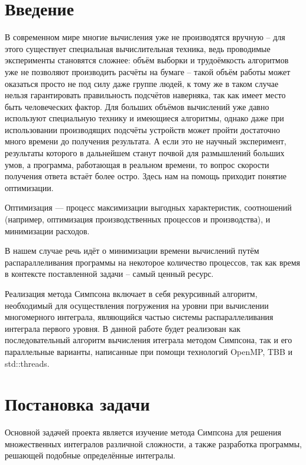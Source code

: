 \documentclass{report}
\begin{document}
\setcounter{page}{2}

\tableofcontents
\newpage

\section*{Введение}
В современном мире многие вычисления уже не производятся вручную – для этого существует специальная вычислительная техника, ведь проводимые эксперименты становятся сложнее: объём выборки и трудоёмкость алгоритмов уже не позволяют производить расчёты на бумаге – такой объём работы может оказаться просто не под силу даже группе людей, к тому же в таком случае нельзя гарантировать правильность подсчётов наверняка, так как имеет место быть человеческих фактор. Для больших объёмов вычислений уже давно используют специальную технику и имеющиеся алгоритмы, однако даже при использовании производящих подсчёты устройств может пройти достаточно много времени до получения результата. А если это не научный эксперимент, результаты которого в дальнейшем станут почвой для размышлений больших умов, а программа, работающая в реальном времени, то вопрос скорости получения ответа встаёт более остро. Здесь нам на помощь приходит понятие оптимизации.
\par Оптимизация — процесс максимизации выгодных характеристик, соотношений (например, оптимизация производственных процессов и производства), и минимизации расходов.
\par В нашем случае речь идёт о минимизации времени вычислений путём распараллеливания программы на некоторое количество процессов, так как время в контексте поставленной задачи – самый ценный ресурс.
\par Реализация метода Симпсона включает в себя рекурсивный алгоритм, необходимый для осуществления погружения на уровни при вычислении многомерного интеграла, являющийся частью системы распараллеливания интеграла первого уровня. В данной работе будет реализован как последовательный алгоритм вычисления итеграла методом Симпсона, так и его параллельные варианты, написанные при помощи технологий OpenMP, TBB и std::threads. 
\newpage

\section*{Постановка задачи}

Основной задачей проекта является изучение метода Симпсона для решения множественных интегралов различной сложности, а также разработка программы, решающей подобные определённые интегралы.
\end{document}

